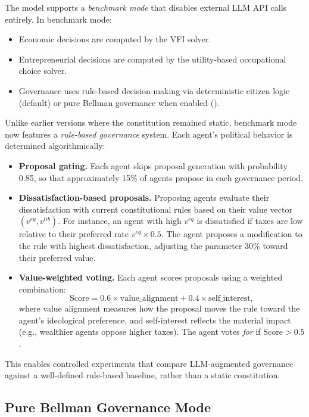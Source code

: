 \documentclass[12pt]{article}
\begin{document}
The model supports a \emph{benchmark mode} that disables external LLM API calls entirely. In benchmark mode:
\begin{itemize}
  \item Economic decisions are computed by the VFI solver.
  \item Entrepreneurial decisions are computed by the utility-based occupational choice solver.
  \item Governance uses rule-based decision-making via deterministic citizen logic (default) or pure Bellman governance when enabled ().
\end{itemize}

Unlike earlier versions where the constitution remained static, benchmark mode now features a \emph{rule-based governance} system. Each agent's political behavior is determined algorithmically:

\begin{itemize}
  \item \textbf{Proposal gating.} Each agent skips proposal generation with probability 0.85, so that approximately 15\% of agents propose in each governance period.
  \item \textbf{Dissatisfaction-based proposals.} Proposing agents evaluate their dissatisfaction with current constitutional rules based on their value vector $(v^{eq}, v^{lib})$. For instance, an agent with high $v^{eq}$ is dissatisfied if taxes are low relative to their preferred rate $v^{eq} \times 0.5$. The agent proposes a modification to the rule with highest dissatisfaction, adjusting the parameter 30\% toward their preferred value.
  \item \textbf{Value-weighted voting.} Each agent scores proposals using a weighted combination:
  \begin{equation}\label{eq:benchmark_voting}
    \text{Score} = 0.6 \times \text{value\_alignment} + 0.4 \times \text{self\_interest},
  \end{equation}
  where value alignment measures how the proposal moves the rule toward the agent's ideological preference, and self-interest reflects the material impact (e.g., wealthier agents oppose higher taxes). The agent votes \emph{for} if $\text{Score} > 0.5$.
\end{itemize}

This enables controlled experiments that compare LLM-augmented governance against a well-defined rule-based baseline, rather than a static constitution.

\subsection{Pure Bellman Governance Mode}\label{sec:pure_bellman_mode}
\end{document}
